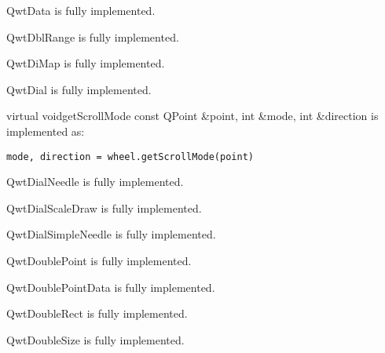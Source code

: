 \documentclass{manual}
\begin{document}
\begin{classdesc*}{QwtData}
  is fully implemented.
\end{classdesc*}

\begin{classdesc*}{QwtDblRange}
  is fully implemented.
\end{classdesc*}

\begin{classdesc*}{QwtDiMap}
  is fully implemented.
\end{classdesc*}

\begin{classdesc*}{QwtDial}
  is fully implemented.

  \begin{cfuncdesc}{virtual void}{getScrollMode}{
      const QPoint \&point, int \&mode, int \&direction}
    is implemented as:
    \begin{verbatim}
mode, direction = wheel.getScrollMode(point)
    \end{verbatim}    
  \end{cfuncdesc}

\end{classdesc*}

\begin{classdesc*}{QwtDialNeedle}
  is fully implemented.
\end{classdesc*}

\begin{classdesc*}{QwtDialScaleDraw}
  is fully implemented.
\end{classdesc*}

\begin{classdesc*}{QwtDialSimpleNeedle}
  is fully implemented.
\end{classdesc*}

\begin{classdesc*}{QwtDoublePoint}
  is fully implemented.
\end{classdesc*}

\begin{classdesc*}{QwtDoublePointData}
  is fully implemented.
\end{classdesc*}

\begin{classdesc*}{QwtDoubleRect}
  is fully implemented.
\end{classdesc*}

\begin{classdesc*}{QwtDoubleSize}
  is fully implemented.
\end{classdesc*}
\end{document}
